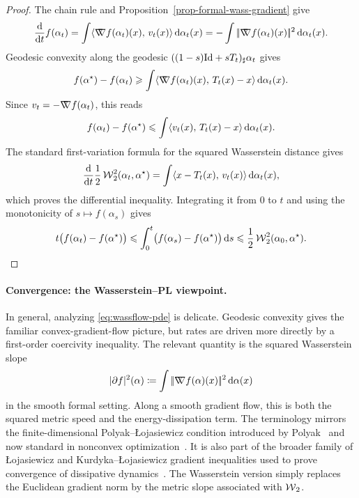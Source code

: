 \begin{proof}
	The chain rule and Proposition~\ref{prop-formal-wass-gradient} give
	\[
		\frac{\mathrm{d}}{\mathrm{d} t}f(\alpha_t)
		=
		\int \langle \mathord{\nabla\mkern-9.3mu\nabla} f(\alpha_t)(x),\,v_t(x)\rangle\,\mathrm{d}\alpha_t(x)
		=
		-\int |\!| \mathord{\nabla\mkern-9.3mu\nabla} f(\alpha_t)(x) |\!|^2\,\mathrm{d}\alpha_t(x).
	\]
	Geodesic convexity along the geodesic
	\(((1-s)\mathrm{Id}+sT_t)_\sharp\alpha_t\) gives
	\[
		f(\alpha^\star)-f(\alpha_t)
		\geqslant
		\int \langle \mathord{\nabla\mkern-9.3mu\nabla} f(\alpha_t)(x),\,T_t(x)-x\rangle\,\mathrm{d}\alpha_t(x).
	\]
	Since \(v_t=-\mathord{\nabla\mkern-9.3mu\nabla} f(\alpha_t)\), this reads
	\[
		f(\alpha_t)-f(\alpha^\star)
		\leqslant
		\int \langle v_t(x),\,T_t(x)-x\rangle\,\mathrm{d}\alpha_t(x).
	\]
	The standard first-variation formula for the squared Wasserstein distance gives
	\[
		\frac{\mathrm{d}}{\mathrm{d} t}\frac12\operatorname{\mathcal{W}}_2^2(\alpha_t,\alpha^\star)
		=
		\int \langle x-T_t(x),\,v_t(x)\rangle\,\mathrm{d}\alpha_t(x),
	\]
	which proves the differential inequality. Integrating it from \(0\) to \(t\) and using the monotonicity of \(s\mapsto f(\alpha_s)\) gives
	\[
		t\bigl(f(\alpha_t)-f(\alpha^\star)\bigr)
		\leqslant
		\int_0^t \bigl(f(\alpha_s)-f(\alpha^\star)\bigr)\,\mathrm{d} s
		\leqslant
		\frac12\operatorname{\mathcal{W}}_2^2(\alpha_0,\alpha^\star).
	\]
\end{proof}


\paragraph{Convergence: the Wasserstein--PL viewpoint.}

In general, analyzing \eqref{eq:wassflow-pde} is delicate. Geodesic convexity gives the familiar convex-gradient-flow picture, but rates are driven more directly by a first-order coercivity inequality. The relevant quantity is the squared Wasserstein slope
\[
	|\partial f|^2(\alpha)
	\coloneqq
	\int|\!| \mathord{\nabla\mkern-9.3mu\nabla} f(\alpha)(x) |\!|^2\,\mathrm{d}\alpha(x)
\]
in the smooth formal setting. Along a smooth gradient flow, this is both the squared metric speed and the energy-dissipation term.
The terminology mirrors the finite-dimensional Polyak--{\L}ojasiewicz condition introduced by Polyak~\cite{Polyak1963GradientMethods} and now standard in nonconvex optimization~\cite{KarimiNutiniSchmidt2016PL}. It is also part of the broader family of {\L}ojasiewicz and Kurdyka--{\L}ojasiewicz gradient inequalities used to prove convergence of dissipative dynamics~\cite{attouch-2010,HauerMazon2019KLSMetric,DelloSchiavoMaasPedrotti2023LocalConditions}. The Wasserstein version simply replaces the Euclidean gradient norm by the metric slope associated with \(\operatorname{\mathcal{W}}_2\).

